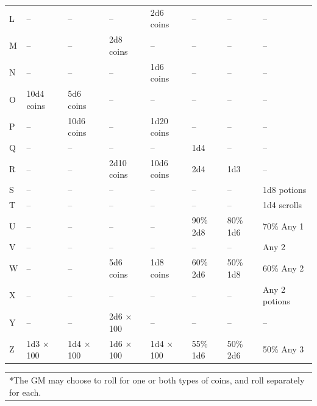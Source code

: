 \begin{minipage}{\textwidth}
\begin{tabular}{|p{}|p{}|p{}|p{}|p{}|p{}|p{}|p{}|}
\rowcolor[gray]{.9}L	& --	& --	& --	& 2d6 coins	& --	& --	& -- \\
M	& --	& --	& 2d8 coins	& --	& --	& --	& -- \\
\rowcolor[gray]{.9}N	& --	& --	& --	& 1d6 coins	& --	& --	& -- \\
O	& 10d4 coins	& 5d6 coins	& --	& --	& --	& --	& -- \\
\rowcolor[gray]{.9}P	& --	& 10d6 coins	& --	& 1d20 coins	& --	& --	& -- \\
Q	& --	& --	& --	& --	& 1d4	& --	& -- \\
\rowcolor[gray]{.9}R	& --	& --	& 2d10 coins	& 10d6 coins	& 2d4	& 1d3	& -- \\
S	& --	& --	& --	& --	& --	& --	& 1d8 potions \\
\rowcolor[gray]{.9}T	& --	& --	& --	& --	& --	& --	& 1d4 scrolls \\
U	& --	& --	& --	& --	& 90\% 2d8	& 80\% 1d6	& 70\% Any 1 \\
\rowcolor[gray]{.9}V	& --	& --	& --	& --	& --	& --	& Any 2 \\
W	& --	& --	& 5d6 coins	& 1d8 coins	& 60\% 2d6	& 50\% 1d8	& 60\% Any 2 \\
\rowcolor[gray]{.9}X	& --	& --	& --	& --	& --	& --	& Any 2 potions \\
Y	& --	& --	& 2d6 $\times$ 100	& --	& --	& --	& -- \\
\rowcolor[gray]{.9}Z	& 1d3 $\times$ 100	& 1d4 $\times$ 100	& 1d6 $\times$ 100	& 1d4 $\times$ 100	& 55\% 1d6	& 50\% 2d6	& 50\% Any 3 \\
\hline
\end{tabular}
\noindent\begin{tabular}{p{}}
*The GM may choose to roll for one or both types of coins, and roll separately for each. \\
\end{tabular}\vspace{.5em}

\end{minipage}

\pagebreak

